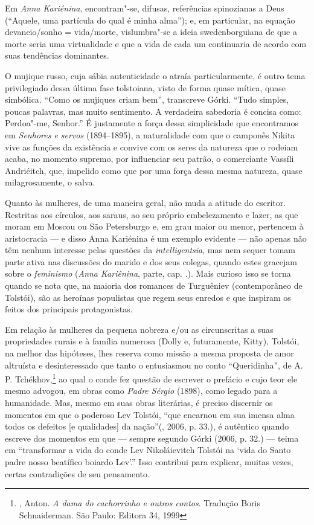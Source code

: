 Em \emph{Anna Kariénina}, encontram"-se, difusas, referências
spinozianas a Deus (``Aquele, uma partícula do qual é minha
alma''); e, em particular, na equação
devaneio/sonho = vida/morte, vislumbra"-se a ideia swedenborguiana
de que a morte seria uma virtualidade e que a vida de cada um
continuaria de acordo com suas tendências dominantes.

O mujique russo, cuja sábia autenticidade o atraía particularmente,
é outro tema privilegiado dessa última fase tolstoiana, visto de
forma quase mítica, quase simbólica. ``Como os mujiques criam bem'',
transcreve Górki. ``Tudo simples, poucas palavras, mas muito
sentimento. A verdadeira sabedoria é concisa como: Perdoa"-me, Senhor.''
É justamente a força dessa simplicidade que encontramos
em \emph{Senhores e servos} (1894--1895), a naturalidade com que o
camponês Nikita vive as funções da existência e convive com os seres da
natureza que o rodeiam acaba, no momento supremo, por influenciar seu
patrão, o comerciante Vassíli Andriéitch, que, impelido como que por uma
força dessa mesma natureza, quase milagrosamente, o salva.

Quanto às mulheres, de uma maneira geral, não muda a atitude do
escritor. Restritas aos círculos, aos saraus, ao seu próprio
embelezamento e lazer, as que moram em Moscou ou São Petersburgo e,
em grau maior ou menor, pertencem à aristocracia --- e disso Anna
Kariénina é um exemplo evidente --- não apenas não têm nenhum
interesse pelas questões da \emph{intelligentsia}, mas nem sequer
tomam parte ativa nas discussões do marido e dos seus colegas,
quando estes gracejam sobre o \emph{feminismo} (\emph{Anna
Kariênina},  parte, cap. .). Mais curioso
isso se torna quando se nota que, na maioria dos romances de
Turguêniev (contemporâneo de Tolstói), são as heroínas populistas
que regem seus enredos e que inspiram os feitos dos principais
protagonistas.

Em relação às mulheres da pequena nobreza e/ou as circunscritas a
suas propriedades rurais e à família numerosa (Dolly e,
futuramente, Kitty), Tolstói, na melhor das hipóteses, lhes
reserva como missão a mesma proposta de amor altruísta e
desinteressado que tanto o entusiasmou no conto ``Queridinha'',
de A. P. Tchékhov,\footnote{, Anton. \emph{A dama
do cachorrinho e outros contos}. Tradução Boris Schnaiderman. São
Paulo: Editora 34, 1999} ao qual o conde fez questão de escrever
o prefácio e cujo teor ele mesmo advogou, em obras como
\emph{Padre Sérgio} (1898), como legado para a humanidade. Mas, mesmo
em suas obras literárias, é preciso discernir os momentos em que o
poderoso Lev Tolstói, ``que encarnou em sua imensa alma todos os
defeitos {[}e qualidades{]} da nação''(, 2006, p. 33.),
é autêntico quando escreve dos momentos em que --- sempre segundo
Górki (2006, p. 32.) --- teima em ``transformar a vida do conde Lev
Nikoláievitch Tolstói na ‘vida do Santo padre nosso beatífico boiardo
Lev’.'' Isso contribui para explicar, muitas vezes, certas contradições
de seu pensamento.

